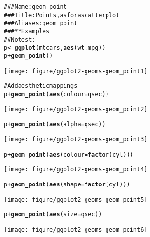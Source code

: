 \documentclass[a4paper,titlepage]{tufte-handout}\usepackage{graphicx, color}
\makeatletter
\def\maxwidth{ %
  \ifdim\Gin@nat@width>\linewidth
    \linewidth
  \else
    \Gin@nat@width
  \fi
}
\newcommand{\hlfunctioncall}[1]{\textcolor[rgb]{0.501960784313725,0,0.329411764705882}{\textbf{#1}}}%
\newcommand{\hlcomment}[1]{\textcolor[rgb]{0.180392156862745,0.6,0.341176470588235}{#1}}%
\newenvironment{kframe}{%
 \def\at@end@of@kframe{}%
 \ifinner\ifhmode%
  \def\at@end@of@kframe{\end{minipage}}%
  \begin{minipage}{\columnwidth}%
 \fi\fi%
 \def\FrameCommand##1{\hskip\@totalleftmargin \hskip-\fboxsep
 \colorbox{shadecolor}{##1}\hskip-\fboxsep
     \hskip-\linewidth \hskip-\@totalleftmargin \hskip\columnwidth}%
 \MakeFramed {\advance\hsize-\width
   \@totalleftmargin\z@ \linewidth\hsize
   \@setminipage}}%
 {\par\unskip\endMakeFramed%
 \at@end@of@kframe}
\newenvironment{knitrout}{}{} %
\makeatother
\begin{document}
\begin{knitrout}
\color{fgcolor}\begin{kframe}
\begin{alltt}
\hlcomment{### Name: geom_point}
\hlcomment{### Title: Points, as for a scatterplot}
\hlcomment{### Aliases: geom_point}
\hlcomment{### ** Examples}
\hlcomment{## No test: }
p <- \hlfunctioncall{ggplot}(mtcars, \hlfunctioncall{aes}(wt, mpg))
p + \hlfunctioncall{geom_point}()
\end{alltt}
\end{kframe}\texttt{[image: figure/ggplot2-geoms-geom\_point1]} \begin{kframe}\begin{alltt}
\hlcomment{# Add aesthetic mappings}
p + \hlfunctioncall{geom_point}(\hlfunctioncall{aes}(colour = qsec))
\end{alltt}
\end{kframe}\texttt{[image: figure/ggplot2-geoms-geom\_point2]} \begin{kframe}\begin{alltt}
p + \hlfunctioncall{geom_point}(\hlfunctioncall{aes}(alpha = qsec))
\end{alltt}
\end{kframe}\texttt{[image: figure/ggplot2-geoms-geom\_point3]} \begin{kframe}\begin{alltt}
p + \hlfunctioncall{geom_point}(\hlfunctioncall{aes}(colour = \hlfunctioncall{factor}(cyl)))
\end{alltt}
\end{kframe}\texttt{[image: figure/ggplot2-geoms-geom\_point4]} \begin{kframe}\begin{alltt}
p + \hlfunctioncall{geom_point}(\hlfunctioncall{aes}(shape = \hlfunctioncall{factor}(cyl)))
\end{alltt}
\end{kframe}\texttt{[image: figure/ggplot2-geoms-geom\_point5]} \begin{kframe}\begin{alltt}
p + \hlfunctioncall{geom_point}(\hlfunctioncall{aes}(size = qsec))
\end{alltt}
\end{kframe}\texttt{[image: figure/ggplot2-geoms-geom\_point6]} \begin{kframe}\begin{alltt}

\end{alltt}
\end{kframe}
\end{knitrout}
\end{document}
